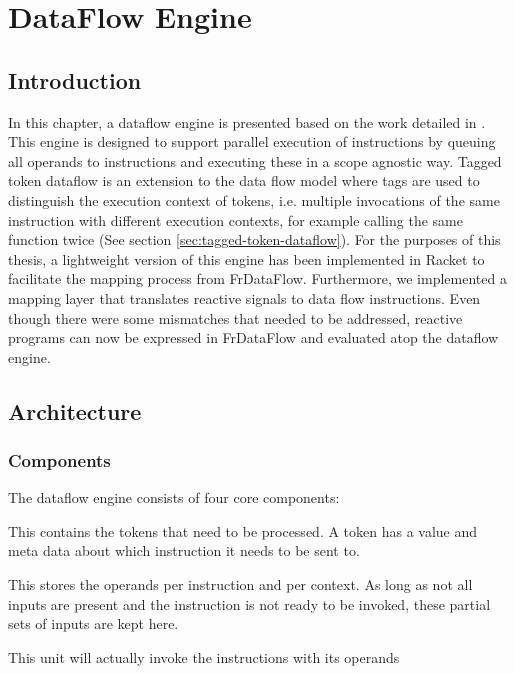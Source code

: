 \chapter{DataFlow Engine}

\section{Introduction}

In this chapter, a dataflow engine is presented based on the work detailed in \citet{saey_extensible_2017}.
This engine is designed to support parallel execution of instructions by queuing all operands to instructions and executing these in a scope agnostic way.
Tagged token dataflow is an extension to the data flow model where tags are used to distinguish the execution context of tokens, i.e. multiple invocations of the same instruction with different execution contexts, for example calling the same function twice (See section \ref{sec:tagged-token-dataflow}).
For the purposes of this thesis, a lightweight version of this engine has been implemented in Racket to facilitate the mapping process from FrDataFlow. Furthermore, we implemented a mapping layer that translates reactive signals to data flow instructions. Even though there were some mismatches that needed to be addressed, reactive programs can now be expressed in FrDataFlow and evaluated atop the dataflow engine. 

\newpage
\section{Architecture}

\subsection{Components}

The dataflow engine consists of four core components:

\begin{description}[style=nextline]
	\item[The token queue] This contains the tokens that need to be processed. A token has a value and meta data about which instruction it needs to be sent to. 
	\item[The matching memory] This stores the operands per instruction and per context. As long as not all inputs are present and the instruction is not ready to be invoked, these partial sets of inputs are kept here.
	\item[The execution unit] This unit will actually invoke the instructions with its operands
\end{description}

